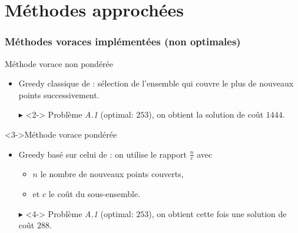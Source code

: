 \documentclass[aspectratio=169,11pt]{beamer}
\begin{document}
	\begin{frame}
		\centering\footnotesize
		
	\end{frame}

	\begin{frame}
		\centering\footnotesize
	\end{frame}
	\section{Méthodes approchées}

	\begin{frame}
		\frametitle{Méthodes voraces implémentées (non optimales)}
		\begin{block}{Méthode vorace non pondérée}
			\begin{itemize}
				\item Greedy classique de \citeauthor{Johnson:1973:AAC:800125.804034}: sélection de l'ensemble qui couvre le plus de nouveaux points successivement.
				\item[\alert{\(\blacktriangleright\)}]<2-> Problème \emph{A.1} (optimal: \(253\)), on obtient la solution de coût \alert{\(1444\)}.
			\end{itemize}
		\end{block}
		\begin{block}<3->{Méthode vorace pondérée}
			\begin{itemize}
				\item Greedy basé sur celui de \citeauthor{Johnson:1973:AAC:800125.804034}: on utilise le rapport \(\frac{n}{c}\) avec
					\begin{itemize}
						\item \(n\) le nombre de nouveaux points couverts,
						\item et \(c\) le coût du sous-ensemble.
					\end{itemize}
				\item[\alert{\(\blacktriangleright\)}]<4-> Problème \emph{A.1} (optimal: \(253\)), on obtient cette fois une solution de coût \alert{\(288\)}.
			\end{itemize}
		\end{block}
	\end{frame}

	\begin{frame}
		\centering
		
	\end{frame}
\end{document}
